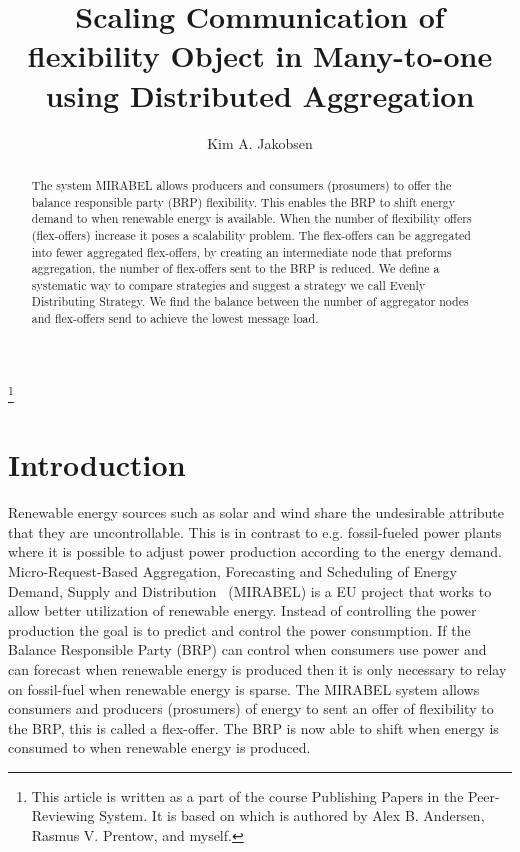 \documentclass{ifacconf}
\begin{document}
\begin{frontmatter}

\title{Scaling Communication of flexibility Object in Many-to-one using Distributed Aggregation} %

\thanks[footnoteinfo]{This article is written as a part of the course Publishing Papers in the Peer-Reviewing System. It is based on \cite{SCEDFDA} which is authored by Alex B. Andersen, Rasmus V. Prentow, and myself.}

\author[First]{Kim A. Jakobsen} 


\address[First]{Department of Computer Science, Aalborg University, Selma Lagerl\"{o}fs Vej 300 DK-9220 Aalborg East (e-mail: kjakob09@student.aau.dk).}                                              


\begin{abstract}                          
The system MIRABEL allows producers and consumers (prosumers) to offer the balance responsible party (BRP) flexibility. 
This enables the BRP to shift energy demand to when renewable energy is available. 
When the number of flexibility offers (flex-offers) increase it poses a scalability problem. 
The flex-offers can be aggregated into fewer aggregated flex-offers, by creating an intermediate node that preforms aggregation, the number of flex-offers sent to the BRP is reduced.
We define a systematic way to compare strategies and suggest a strategy we call Evenly Distributing Strategy. 
We find the balance between the number of aggregator nodes and flex-offers send to achieve the lowest message load. 
\end{abstract}

\end{frontmatter}

\section{Introduction}
Renewable energy sources such as solar and wind share the undesirable attribute that they are uncontrollable. 
This is in contrast to e.g. fossil-fueled power plants where it is possible to adjust power production according to the energy demand. 
Micro-Request-Based Aggregation, Forecasting and Scheduling of Energy Demand, Supply and Distribution~\cite{mirabel} (MIRABEL) is a EU project that works to allow better utilization of renewable energy. 
Instead of controlling the power production the goal is to predict and control the power consumption. 
If the Balance Responsible Party (BRP) can control when consumers use power and can forecast when renewable energy is produced then it is only necessary to relay on fossil-fuel when renewable energy is sparse.
The MIRABEL system allows consumers and producers (prosumers) of energy to sent an offer of flexibility to the BRP, this is called a flex-offer. 
The BRP is now able to shift when energy is consumed to when renewable energy is produced.
\end{document}
